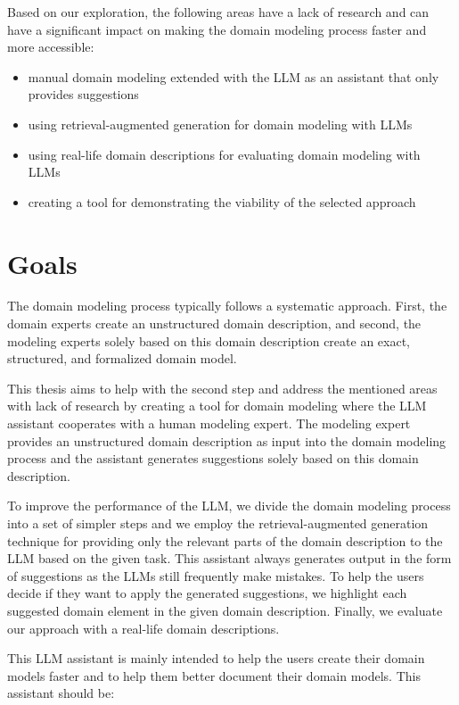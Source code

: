 Based on our exploration, the following areas have a lack of research and can have a significant impact on making the domain modeling process faster and more accessible:

\begin{itemize}
\item manual domain modeling extended with the LLM as an assistant that only provides suggestions
\item using retrieval-augmented generation for domain modeling with LLMs
\item using real-life domain descriptions for evaluating domain modeling with LLMs
\item creating a tool for demonstrating the viability of the selected approach
\end{itemize}


\section*{Goals}

The domain modeling process typically follows a systematic approach. First, the domain experts create an unstructured domain description, and second, the modeling experts solely based on this domain description create an exact, structured, and formalized domain model.

This thesis aims to help with the second step and address the mentioned areas with lack of research by creating a tool for domain modeling where the LLM assistant cooperates with a human modeling expert. The modeling expert provides an unstructured domain description as input into the domain modeling process and the assistant generates suggestions solely based on this domain description.

To improve the performance of the LLM, we divide the domain modeling process into a set of simpler steps and we employ the retrieval-augmented generation technique for providing only the relevant parts of the domain description to the LLM based on the given task. This assistant always generates output in the form of suggestions as the LLMs still frequently make mistakes. To help the users decide if they want to apply the generated suggestions, we highlight each suggested domain element in the given domain description. Finally, we evaluate our approach with a real-life domain descriptions.

This LLM assistant is mainly intended to help the users create their domain models faster and to help them better document their domain models. This assistant should be:

